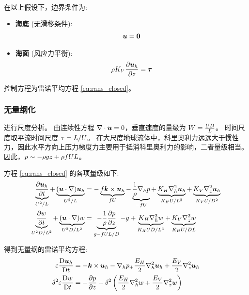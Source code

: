 在以上假设下，边界条件为:
\begin{itemize}
    \item \textbf{海底} (无滑移条件):
    \begin{equation}
        \bm{u} = \bm{0}
        \label{eq:ocean_boundary_condition_top}
    \end{equation}
    \item \textbf{海面} (风应力平衡):
    \begin{equation}
        \density \eddyviscv \pde{\vel_h}{z} = \wind
        \label{eq:ocean_boundary_condition_bottom}
    \end{equation}
\end{itemize}

控制方程为雷诺平均方程 \eqref{eq:rans_closed}。

\subsubsection{无量纲化}

进行尺度分析。
由连续性方程 $\nabla \cdot \bm{u} = 0$，垂直速度的量级为 $W = \frac{U D}{L}$。
时间尺度取平流时间尺度 $\tau = L / U$。
在大尺度地球流体中，科里奥利力远远大于惯性力，因此水平方向上压力梯度力主要用于抵消科里奥利力的影响，二者量级相当。
因此，$p \sim -\rho g z + \rho f U L$。

方程 \eqref{eq:rans_closed} 的各项量级如下:
\begin{align*}
    \underbrace{\pde{\vel_h}{\timevar}}_{\hvel^2 / \hscale} + \underbrace{(\vel \cdot \nabla) \vel_h}_{\hvel^2 / \hscale} &= -\underbrace{\coriolis \kvec \times \vel_h}_{\coriolis \hvel} - \underbrace{\frac{1}{\density} \nabla_h \pressure}_{-\coriolis \hvel} + \underbrace{\eddyvisch \nabla_h^2 \vel_h}_{\eddyvisch \hvel / \hscale^2} + \underbrace{\eddyviscv \nabla_z^2 \vel_h}_{\eddyviscv \hvel / \vscale^2} \\
    \underbrace{\pde{w}{\timevar}}_{\hvel^2 \vscale / \hscale^2} + \underbrace{(\vel \cdot \nabla) w}_{\hvel^2 \vscale / \hscale^2} &= \underbrace{-\frac{1}{\density} \pde{\pressure}{z}}_{\gravityconst - \coriolis \hvel \hscale / \vscale} - \gravityconst + \underbrace{\eddyvisch \nabla_h^2 w}_{\eddyvisch \hvel \vscale / \hscale^3} + \underbrace{\eddyviscv \nabla_z^2 w}_{\eddyvisch \hvel / \vscale \hscale}
\end{align*}

得到无量纲的雷诺平均方程:
\begin{align}
    \ro \matderiv{\vel_h} &= -\kvec \times \vel_h -\nabla_h p_ + \frac{\eh}{2} \nabla_h^2 \vel_h + \frac{\ev}{2} \nabla_z^2 \vel_h \label{eq:rans_nondim_h} \\
    \vhratio^2 \ro \matderiv{w} &= -\pde{p}{z} + \vhratio^2 \left(\frac{\eh}{2} \nabla_h^2 w + \frac{\ev}{2} \nabla_z^2 w\right) \label{eq:rans_nondim_v}
\end{align}

